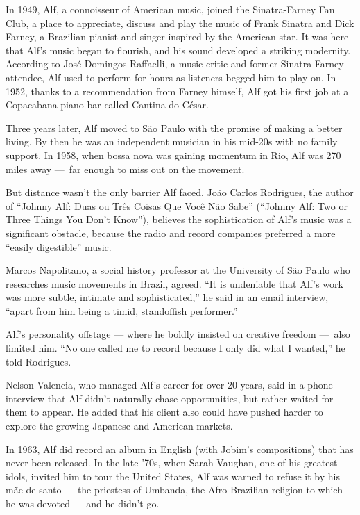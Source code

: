 In 1949, Alf, a connoisseur of American music, joined the Sinatra-Farney
Fan Club, a place to appreciate, discuss and play the music of Frank
Sinatra and Dick Farney, a Brazilian pianist and singer inspired by the
American star. It was here that Alf's music began to flourish, and his
sound developed a striking modernity. According to José Domingos
Raffaelli, a music critic and former Sinatra-Farney attendee, Alf used
to perform for hours as listeners begged him to play on. In 1952, thanks
to a recommendation from Farney himself, Alf got his first job at a
Copacabana piano bar called Cantina do César.

Three years later, Alf moved to São Paulo with the promise of making a
better living. By then he was an independent musician in his mid-20s
with no family support. In 1958, when bossa nova was gaining momentum in
Rio, Alf was 270 miles away ---~far enough to miss out on the movement.

But distance wasn't the only barrier Alf faced. João Carlos Rodrigues,
the author of ``Johnny Alf: Duas ou Três Coisas Que Você Não Sabe''
(``Johnny Alf: Two or Three Things You Don't Know''), believes the
sophistication of Alf's music was a significant obstacle, because the
radio and record companies preferred a more ``easily digestible'' music.

Marcos Napolitano, a social history professor at the University of São
Paulo who researches music movements in Brazil, agreed. ``It is
undeniable that Alf's work was more subtle, intimate and
sophisticated,'' he said in an email interview, ``apart from him being a
timid, standoffish performer.''

Alf's personality offstage --- where he boldly insisted on creative
freedom ---~also limited him. ``No one called me to record because I
only did what I wanted,'' he told Rodrigues.

Nelson Valencia, who managed Alf's career for over 20 years, said in a
phone interview that Alf didn't naturally chase opportunities, but
rather waited for them to appear. He added that his client also could
have pushed harder to explore the growing Japanese and American markets.

In 1963, Alf did record an album in English (with Jobim's compositions)
that has never been released. In the late '70s, when Sarah Vaughan, one
of his greatest idols, invited him to tour the United States, Alf was
warned to refuse it by his mãe de santo --- the priestess of Umbanda,
the Afro-Brazilian religion to which he was devoted --- and he didn't
go.

